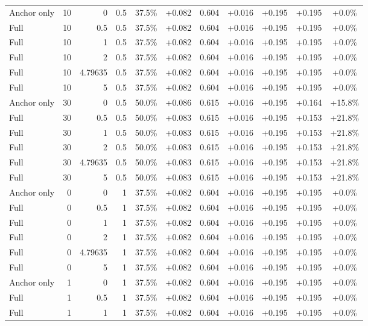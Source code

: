 \begin{table}[htbp]
\begin{tabular}{lrrrccccccc}
Anchor only & 10 & 0 & 0.5 & 37.5\% & +0.082 & 0.604 & +0.016 & +0.195 & +0.195 & +0.0\% \\
Full & 10 & 0.5 & 0.5 & 37.5\% & +0.082 & 0.604 & +0.016 & +0.195 & +0.195 & +0.0\% \\
Full & 10 & 1 & 0.5 & 37.5\% & +0.082 & 0.604 & +0.016 & +0.195 & +0.195 & +0.0\% \\
Full & 10 & 2 & 0.5 & 37.5\% & +0.082 & 0.604 & +0.016 & +0.195 & +0.195 & +0.0\% \\
Full & 10 & 4.79635 & 0.5 & 37.5\% & +0.082 & 0.604 & +0.016 & +0.195 & +0.195 & +0.0\% \\
Full & 10 & 5 & 0.5 & 37.5\% & +0.082 & 0.604 & +0.016 & +0.195 & +0.195 & +0.0\% \\
Anchor only & 30 & 0 & 0.5 & 50.0\% & +0.086 & 0.615 & +0.016 & +0.195 & +0.164 & +15.8\% \\
Full & 30 & 0.5 & 0.5 & 50.0\% & +0.083 & 0.615 & +0.016 & +0.195 & +0.153 & +21.8\% \\
Full & 30 & 1 & 0.5 & 50.0\% & +0.083 & 0.615 & +0.016 & +0.195 & +0.153 & +21.8\% \\
Full & 30 & 2 & 0.5 & 50.0\% & +0.083 & 0.615 & +0.016 & +0.195 & +0.153 & +21.8\% \\
Full & 30 & 4.79635 & 0.5 & 50.0\% & +0.083 & 0.615 & +0.016 & +0.195 & +0.153 & +21.8\% \\
Full & 30 & 5 & 0.5 & 50.0\% & +0.083 & 0.615 & +0.016 & +0.195 & +0.153 & +21.8\% \\
Anchor only & 0 & 0 & 1 & 37.5\% & +0.082 & 0.604 & +0.016 & +0.195 & +0.195 & +0.0\% \\
Full & 0 & 0.5 & 1 & 37.5\% & +0.082 & 0.604 & +0.016 & +0.195 & +0.195 & +0.0\% \\
Full & 0 & 1 & 1 & 37.5\% & +0.082 & 0.604 & +0.016 & +0.195 & +0.195 & +0.0\% \\
Full & 0 & 2 & 1 & 37.5\% & +0.082 & 0.604 & +0.016 & +0.195 & +0.195 & +0.0\% \\
Full & 0 & 4.79635 & 1 & 37.5\% & +0.082 & 0.604 & +0.016 & +0.195 & +0.195 & +0.0\% \\
Full & 0 & 5 & 1 & 37.5\% & +0.082 & 0.604 & +0.016 & +0.195 & +0.195 & +0.0\% \\
Anchor only & 1 & 0 & 1 & 37.5\% & +0.082 & 0.604 & +0.016 & +0.195 & +0.195 & +0.0\% \\
Full & 1 & 0.5 & 1 & 37.5\% & +0.082 & 0.604 & +0.016 & +0.195 & +0.195 & +0.0\% \\
Full & 1 & 1 & 1 & 37.5\% & +0.082 & 0.604 & +0.016 & +0.195 & +0.195 & +0.0\% \\

\end{tabular}
\end{table}
